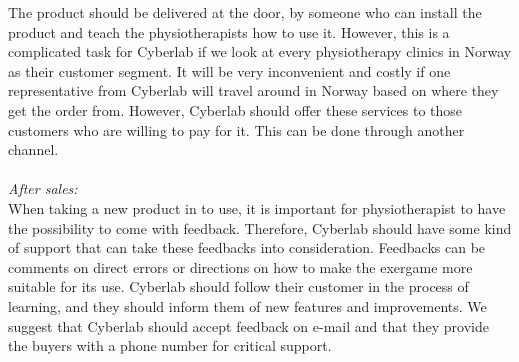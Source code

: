 The product should be delivered at the door, by someone who can install the product and teach the physiotherapists how to use it. However, this is a complicated task for Cyberlab if we look at every physiotherapy clinics in Norway as their customer segment. It will be very inconvenient and costly if  one representative from Cyberlab will travel around in Norway based on where they get the order from. However, Cyberlab should offer these services to those customers who are willing to pay for it. This can be done through another channel. \\ \\
\emph{After sales:}\\
When taking a new product in to use, it is important for physiotherapist to have the possibility to come with feedback. Therefore, Cyberlab should have some kind of support that can take these feedbacks into consideration. Feedbacks can be comments on direct errors or directions on how to make the exergame more suitable for its use. Cyberlab should follow their customer in the process of learning, and they should inform them of new features and improvements. We suggest that Cyberlab should accept feedback on e-mail and that they provide the buyers with a phone number for critical support.  
